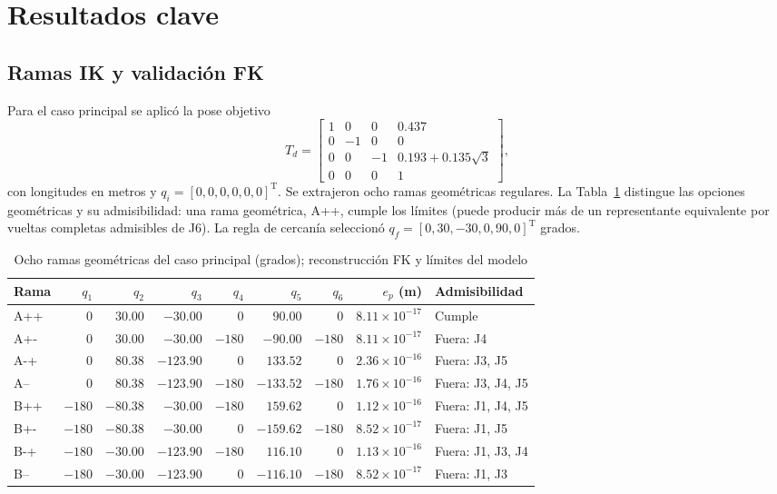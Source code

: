 \documentclass[conference,letterpaper]{IEEEtran}
\newcommand{\trans}{\mathrm{T}}
\begin{document}
	\section{Resultados clave}
	\subsection{Ramas IK y validación FK}
	Para el caso principal se aplicó la pose objetivo
	\begin{equation}
		T_d=\begin{bmatrix}
			1&0&0&0.437\\
			0&-1&0&0\\
			0&0&-1&0.193+0.135\sqrt3\\
			0&0&0&1
		\end{bmatrix},
		\label{eq:pose}
	\end{equation}
	con longitudes en metros y \(q_i=[0,0,0,0,0,0]^\trans\). Se extrajeron ocho ramas geométricas regulares. La Tabla~\ref{tab:ramas} distingue las opciones geométricas y su admisibilidad: una rama geométrica, A++, cumple los límites (puede producir más de un representante equivalente por vueltas completas admisibles de J6). La regla de cercanía seleccionó \(q_f=[0,30,-30,0,90,0]^\trans\) grados.
	
	\begin{table}[!t]
		\caption{Ocho ramas geométricas del caso principal (grados); reconstrucción FK y límites del modelo}
		\label{tab:ramas}
		\centering\footnotesize
		\begin{tabular}{@{}lrrrrrrrl@{}}
			\toprule
			Rama & $q_1$ & $q_2$ & $q_3$ & $q_4$ & $q_5$ & $q_6$ & $e_p$ (m) & Admisibilidad \\
			\midrule
			A++ & $0$ & $30.00$ & $-30.00$ & $0$ & $90.00$ & $0$ & $8.11\!\times\!10^{-17}$ & Cumple \\
			A+- & $0$ & $30.00$ & $-30.00$ & $-180$ & $-90.00$ & $-180$ & $8.11\!\times\!10^{-17}$ & Fuera: J4 \\
			A-+ & $0$ & $80.38$ & $-123.90$ & $0$ & $133.52$ & $0$ & $2.36\!\times\!10^{-16}$ & Fuera: J3, J5 \\
			A-- & $0$ & $80.38$ & $-123.90$ & $-180$ & $-133.52$ & $-180$ & $1.76\!\times\!10^{-16}$ & Fuera: J3, J4, J5 \\
			B++ & $-180$ & $-80.38$ & $-30.00$ & $-180$ & $159.62$ & $0$ & $1.12\!\times\!10^{-16}$ & Fuera: J1, J4, J5 \\
			B+- & $-180$ & $-80.38$ & $-30.00$ & $0$ & $-159.62$ & $-180$ & $8.52\!\times\!10^{-17}$ & Fuera: J1, J5 \\
			B-+ & $-180$ & $-30.00$ & $-123.90$ & $-180$ & $116.10$ & $0$ & $1.13\!\times\!10^{-16}$ & Fuera: J1, J3, J4 \\
			B-- & $-180$ & $-30.00$ & $-123.90$ & $0$ & $-116.10$ & $-180$ & $8.52\!\times\!10^{-17}$ & Fuera: J1, J3 \\
			\bottomrule
		\end{tabular}
	\end{table}
	
\end{document}
